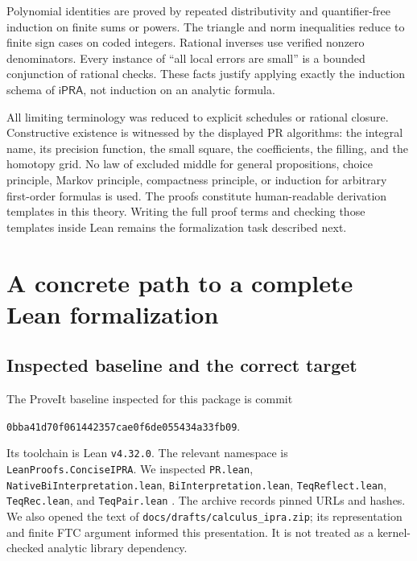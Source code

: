 \documentclass[11pt]{article}
\theoremstyle{definition}
\newcommand{\ipra}{\mathsf{iPRA}}
\newcommand{\code}[1]{\texttt{#1}}
\begin{document}
Polynomial identities are proved by repeated distributivity and
quantifier-free induction on finite sums or powers. The triangle and
norm inequalities reduce to finite sign cases on coded integers.
Rational inverses use verified nonzero denominators. Every instance of
``all local errors are small'' is a bounded conjunction of rational
checks. These facts justify applying exactly the induction schema of
\(\ipra\), not induction on an analytic formula.

All limiting terminology was reduced to explicit schedules or rational
closure. Constructive existence is witnessed by the displayed PR
algorithms: the integral name, its precision function, the small square,
the coefficients, the filling, and the homotopy grid. No law of excluded
middle for general propositions, choice principle, Markov principle,
compactness principle, or induction for arbitrary first-order formulas
is used. The proofs constitute human-readable derivation templates in
this theory. Writing the full proof terms and checking those templates
inside Lean remains the formalization task described next.

\section{A concrete path to a complete Lean formalization}\label{sec:lean}

\subsection{Inspected baseline and the correct target}

The ProveIt baseline inspected for this package is commit
\begin{center}
\code{0bba41d70f061442357cae0f6de055434a33fb09}.
\end{center}
Its toolchain is Lean \code{v4.32.0}. The relevant namespace is
\code{LeanProofs.ConciseIPRA}. We inspected \code{PR.lean},
\code{NativeBiInterpretation.lean}, \code{BiInterpretation.lean},
\code{TeqReflect.lean}, \code{TeqRec.lean}, and \code{TeqPair.lean}
\cite{prsource,nativesource,reflectsource}. The archive records pinned
URLs and hashes. We also opened the text of
\code{docs/drafts/calculus\_ipra.zip}; its representation and finite
FTC argument informed this presentation. It is not treated as a
kernel-checked analytic library dependency.
\end{document}
